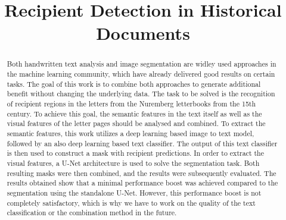 \documentclass[conference]{IEEEtran}
\begin{document}
\title {Recipient Detection in Historical Documents}

\author{
}

\maketitle

\begin{abstract}
Both handwritten text analysis and image segmentation are widley used approaches in the machine learning community, which have already delivered good results on certain tasks. The goal of this work is to combine both approaches to generate additional benefit without changing the underlying data. The task to be solved is the recognition of recipient regions in the letters from the Nuremberg letterbooks from the 15th century. To achieve this goal, the semantic features in the text itself as well as the visual features of the letter pages should be analysed and combined. To extract the semantic features, this work utilizes a deep learning based image to text model, followed by an also deep learning based text classifier. The output of this text classifier is then used to construct a mask with recipient predictions. In order to extract the visual features, a U-Net architecture is used to solve the segmentation task. Both resulting masks were then combined, and the results were subsequently evaluated. The results obtained show that a minimal performance boost was achieved compared to the segmentation using the standalone U-Net. However, this performance boost is not completely satisfactory, which is why we have to work on the quality of the text classification or the combination method in the future.
\end{abstract}
\end{document}

